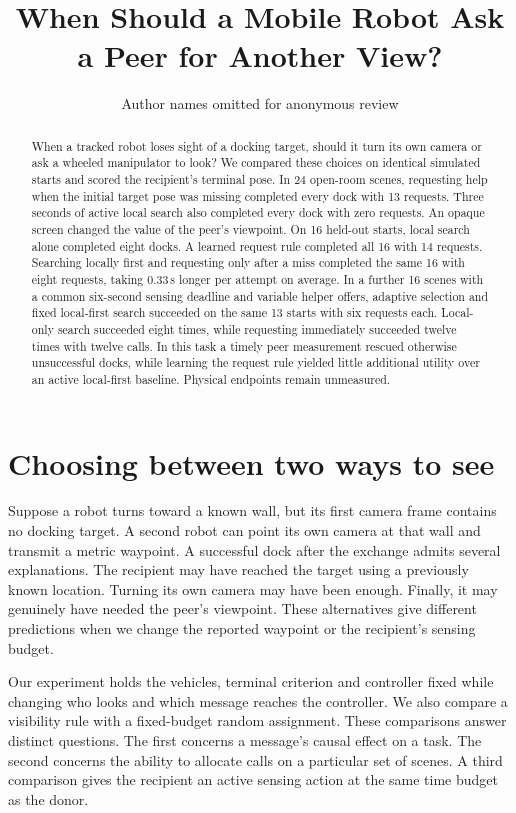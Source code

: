 \documentclass[conference]{IEEEtran}
\begin{document}
\title{When Should a Mobile Robot Ask a Peer for Another View?}
\author{Author names omitted for anonymous review}
\maketitle
\thispagestyle{empty}
\begin{abstract}
When a tracked robot loses sight of a docking target, should it turn its own camera or ask a wheeled manipulator to look? We compared these choices on identical simulated starts and scored the recipient's terminal pose. In 24 open-room scenes, requesting help when the initial target pose was missing completed every dock with 13 requests. Three seconds of active local search also completed every dock with zero requests. An opaque screen changed the value of the peer's viewpoint. On 16 held-out starts, local search alone completed eight docks. A learned request rule completed all 16 with 14 requests. Searching locally first and requesting only after a miss completed the same 16 with eight requests, taking 0.33\,s longer per attempt on average. In a further 16 scenes with a common six-second sensing deadline and variable helper offers, adaptive selection and fixed local-first search succeeded on the same 13 starts with six requests each. Local-only search succeeded eight times, while requesting immediately succeeded twelve times with twelve calls. In this task a timely peer measurement rescued otherwise unsuccessful docks, while learning the request rule yielded little additional utility over an active local-first baseline. Physical endpoints remain unmeasured.
\end{abstract}
\IEEEpeerreviewmaketitle

\section{Choosing between two ways to see}
Suppose a robot turns toward a known wall, but its first camera frame contains no docking target. A second robot can point its own camera at that wall and transmit a metric waypoint. A successful dock after the exchange admits several explanations. The recipient may have reached the target using a previously known location. Turning its own camera may have been enough. Finally, it may genuinely have needed the peer's viewpoint. These alternatives give different predictions when we change the reported waypoint or the recipient's sensing budget.

Our experiment holds the vehicles, terminal criterion and controller fixed while changing who looks and which message reaches the controller. We also compare a visibility rule with a fixed-budget random assignment. These comparisons answer distinct questions. The first concerns a message's causal effect on a task. The second concerns the ability to allocate calls on a particular set of scenes. A third comparison gives the recipient an active sensing action at the same time budget as the donor.
\end{document}
